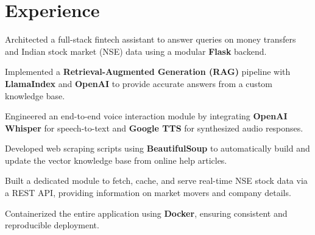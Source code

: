 \documentclass[]{deedy-resume-reversed}
\begin{document}
%
%

%
%

\begin{minipage}[t]{0.60\textwidth}


\section{Experience}
\vspace{\topsep} %
\begin{tightemize}
\item Architected a full-stack fintech assistant to answer queries on money transfers and Indian stock market (NSE) data using a modular \textbf{Flask} backend.
\item Implemented a \textbf{Retrieval-Augmented Generation (RAG)} pipeline with \textbf{LlamaIndex} and \textbf{OpenAI} to provide accurate answers from a custom knowledge base.
\item Engineered an end-to-end voice interaction module by integrating \textbf{OpenAI Whisper} for speech-to-text and \textbf{Google TTS} for synthesized audio responses.
\item Developed web scraping scripts using \textbf{BeautifulSoup} to automatically build and update the vector knowledge base from online help articles.
\item Built a dedicated module to fetch, cache, and serve real-time NSE stock data via a REST API, providing information on market movers and company details.
\item Containerized the entire application using \textbf{Docker}, ensuring consistent and reproducible deployment.
\end{tightemize}
\sectionsep



\end{minipage}
\end{document}
